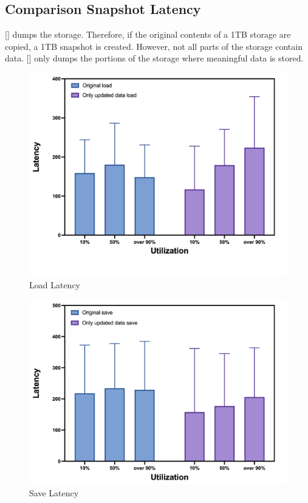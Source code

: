 
\subsection{Comparison Snapshot Latency}
[] dumps the storage.
Therefore, if the original contents of a 1TB storage are copied, a 1TB snapshot is created.
However, not all parts of the storage contain data.
[] only dumps the portions of the storage where meaningful data is stored.

\begin{figure}[t]
    \centering
	\includegraphics[width=0.95\columnwidth]{graphs/load_latency}
	\caption{Load Latency}
	\label{f:load_latency}
\end{figure}

\begin{figure}[t]
    \centering
	\includegraphics[width=0.95\columnwidth]{graphs/save_latency}
	\caption{Save Latency}
	\label{f:save_latency}
\end{figure}

